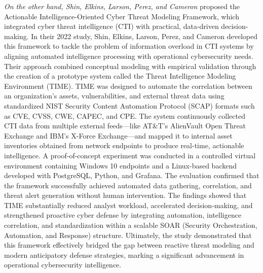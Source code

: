 \textit{On the other hand, Shin, Elkins, Larson, Perez, and Cameron} proposed the Actionable Intelligence-Oriented Cyber Threat Modeling Framework, which integrated cyber threat intelligence (CTI) with practical, data-driven decision-making. In their 2022 study, Shin, Elkins, Larson, Perez, and Cameron developed this framework to tackle the problem of information overload in CTI systems by aligning automated intelligence processing with operational cybersecurity needs. Their approach combined conceptual modeling with empirical validation through the creation of a prototype system called the Threat Intelligence Modeling Environment (TIME). TIME was designed to automate the correlation between an organization's assets, vulnerabilities, and external threat data using standardized NIST Security Content Automation Protocol (SCAP) formats such as CVE, CVSS, CWE, CAPEC, and CPE. The system continuously collected CTI data from multiple external feeds—like AT\&T's AlienVault Open Threat Exchange and IBM's X-Force Exchange—and mapped it to internal asset inventories obtained from network endpoints to produce real-time, actionable intelligence. A proof-of-concept experiment was conducted in a controlled virtual environment containing Windows 10 endpoints and a Linux-based backend developed with PostgreSQL, Python, and Grafana. The evaluation confirmed that the framework successfully achieved automated data gathering, correlation, and threat alert generation without human intervention. The findings showed that TIME substantially reduced analyst workload, accelerated decision-making, and strengthened proactive cyber defense by integrating automation, intelligence correlation, and standardization within a scalable SOAR (Security Orchestration, Automation, and Response) structure. Ultimately, the study demonstrated that this framework effectively bridged the gap between reactive threat modeling and modern anticipatory defense strategies, marking a significant advancement in operational cybersecurity intelligence. \cite{shin2022}

